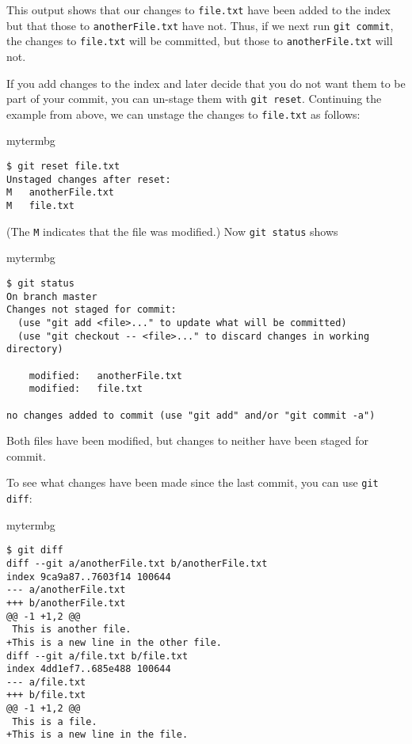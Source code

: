 This output shows that our changes to \texttt{file.txt} have been added to the
index but that those to \texttt{anotherFile.txt} have not.  Thus, if we next
run \texttt{git commit}, the changes to \texttt{file.txt} will be committed,
but those to \texttt{anotherFile.txt} will not.

If you add changes to the index and later decide that you do not want them to
be part of your commit, you can un-stage them with \texttt{git reset}.
Continuing the example from above, we can unstage the changes to
\texttt{file.txt} as follows:

\begin{tsession}{mytermbg}
\begin{verbatim}
$ git reset file.txt
Unstaged changes after reset:
M	anotherFile.txt
M	file.txt
\end{verbatim}
\end{tsession}

(The \texttt{M} indicates that the file was modified.)  Now \texttt{git status} shows

\begin{tsession}{mytermbg}
\begin{verbatim}
$ git status
On branch master
Changes not staged for commit:
  (use "git add <file>..." to update what will be committed)
  (use "git checkout -- <file>..." to discard changes in working directory)

	modified:   anotherFile.txt
	modified:   file.txt

no changes added to commit (use "git add" and/or "git commit -a")
\end{verbatim}
\end{tsession}

Both files have been modified, but changes to neither have been staged for
commit.

To see what changes have been made since the last commit, you can use
\texttt{git diff}:

\begin{tsession}{mytermbg}
\begin{verbatim}
$ git diff
diff --git a/anotherFile.txt b/anotherFile.txt
index 9ca9a87..7603f14 100644
--- a/anotherFile.txt
+++ b/anotherFile.txt
@@ -1 +1,2 @@
 This is another file.
+This is a new line in the other file.
diff --git a/file.txt b/file.txt
index 4dd1ef7..685e488 100644
--- a/file.txt
+++ b/file.txt
@@ -1 +1,2 @@
 This is a file.
+This is a new line in the file.
\end{verbatim}
\end{tsession}

